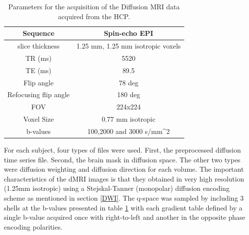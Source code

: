 \documentclass[msthesis.tex]{subfiles}
\begin{document}
\begin{table}[]
\centering
    \begin{tabular}{|c|c|}
         \hline
         Sequence &  Spin-echo EPI \\
         \hline
         slice thickness & 1.25 mm, 1.25 mm isotropic voxels\\
          \hline
         TR (ms) & 5520  \\
          \hline
         TE (ms) & 89.5 \\
          \hline
         Flip angle & 78 deg \\
          \hline
         Refocusing flip angle & 180 deg \\
          \hline
         FOV & 224x224 \\
          \hline
         Voxel Size & 0.77 mm isotropic \\
          \hline
         b-values & 100,2000 and 3000 s/mm^2\\
          \hline
    \end{tabular}
    \caption{Parameters for the acquisition of the Diffusion MRI data acquired from the HCP.}
    \label{tab:diffusionmripara}
\end{table}
For each subject, four types of files were used. First, the preprocessed diffusion time series file. Second, the brain mask in diffusion space. The other two types were diffusion weighting and diffusion direction for each volume. The important characteristics of the dMRI images is that they obtained in very high resolution (1.25mm isotropic) using a Stejskal-Tanner (monopolar) diffusion encoding scheme as mentioned in section \ref{DWI}. The q-space was sampled by including 3 shells at the b-values presented in table \ref{tab:diffusionmripara} with each gradient table defined by a single b-value acquired once with right-to-left and another in the opposite phase encoding polarities. 
\end{document}
